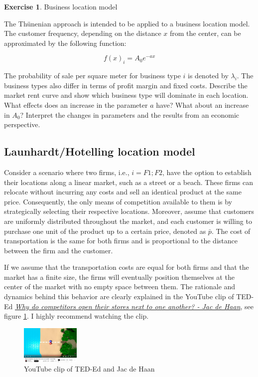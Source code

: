 \documentclass[
  12pt,
  oneside]{book}
\theoremstyle{definition}
\theoremstyle{definition}
\theoremstyle{definition}
\newtheorem{exercise}{Exercise}[chapter]
\theoremstyle{definition}
\theoremstyle{remark}
\begin{document}
\begin{exercise}
\protect\hypertarget{exr:thuenen2}{}\label{exr:thuenen2}Business location model

The Thünenian approach is intended to be applied to a business location model. The customer frequency, depending on the distance \(x\) from the center, can be approximated by the following function:

\[ f(x)_i = A_{0} e^{-a x} \]

The probability of sale per square meter for business type \(i\) is denoted by \(\lambda_i\). The business types also differ in terms of profit margin and fixed costs. Describe the market rent curve and show which business type will dominate in each location. What effects does an increase in the parameter \(a\) have? What about an increase in \(A_0\)? Interpret the changes in parameters and the results from an economic perspective.
\end{exercise}

\subsection{Launhardt/Hotelling location model}\label{launhardthotelling-location-model}

Consider a scenario where two firms, i.e., \(i={F1;F2}\), have the option to establish their locations along a linear market, such as a street or a beach. These firms can relocate without incurring any costs and sell an identical product at the same price. Consequently, the only means of competition available to them is by strategically selecting their respective locations.
Moreover, assume that customers are uniformly distributed throughout the market, and each customer is willing to purchase one unit of the product up to a certain price, denoted as \(\bar{p}\). The cost of transportation is the same for both firms and is proportional to the distance between the firm and the customer.

If we assume that the transportation costs are equal for both firms and that the market has a finite size, the firms will eventually position themselves at the center of the market with no empty space between them. The rationale and dynamics behind this behavior are clearly explained in the YouTube clip of TED-Ed \href{https://youtu.be/jILgxeNBK_8}{\emph{Why do competitors open their stores next to one another? - Jac de Haan}}, see figure \ref{fig:hotelling}. I highly recommend watching the clip.

\begin{figure}
\centering
\includegraphics[width=0.25\textwidth,height=\textheight]{fig/hotelling.png}
\caption[\label{fig:hotelling} YouTube clip of TED-Ed and Jac de Haan]{\label{fig:hotelling} YouTube clip of TED-Ed and Jac de Haan\footnotemark{}}
\end{figure}
\end{document}

